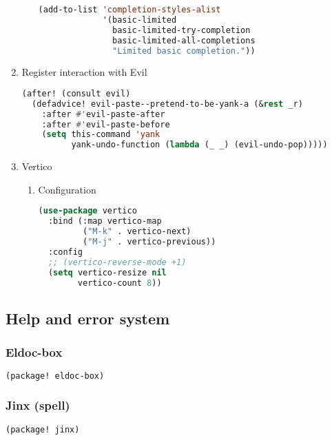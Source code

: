 \documentclass[11pt]{article}
\begin{document}
\begin{enumerate}
\begin{enumerate}
\begin{lstlisting}[language=Lisp]
(add-to-list 'completion-styles-alist
             '(basic-limited
               basic-limited-try-completion
               basic-limited-all-completions
               "Limited basic completion."))
\end{lstlisting}
\end{enumerate}

  \item Register interaction with Evil
  \label{sec:register-interaction-with-evil}

  \begin{lstlisting}[language=Lisp]
(after! (consult evil)
  (defadvice! evil-paste--pretend-to-be-yank-a (&rest _r)
    :after #'evil-paste-after
    :after #'evil-paste-before
    (setq this-command 'yank
          yank-undo-function (lambda (_ _) (evil-undo-pop)))))
\end{lstlisting}
  \item Vertico
  \label{sec:vertico}

  
\begin{enumerate}
  \item Configuration
  \label{sec:configuration-3}

  \begin{lstlisting}[language=Lisp]
(use-package vertico
  :bind (:map vertico-map
         ("M-k" . vertico-next)
         ("M-j" . vertico-previous))
  :config
  ;; (vertico-reverse-mode +1)
  (setq vertico-resize nil
        vertico-count 8))
\end{lstlisting}
\end{enumerate}

\end{enumerate}


\subsection{Help and error system}
\label{sec:help-and-error-system}


\subsubsection{Eldoc-box}
\label{sec:eldoc-box}
\begin{lstlisting}[language=Lisp]
(package! eldoc-box)
\end{lstlisting}

\subsubsection{Jinx (spell)}
\label{sec:jinx-spell}
\begin{lstlisting}[language=Lisp]
(package! jinx)
\end{lstlisting}
\end{document}
